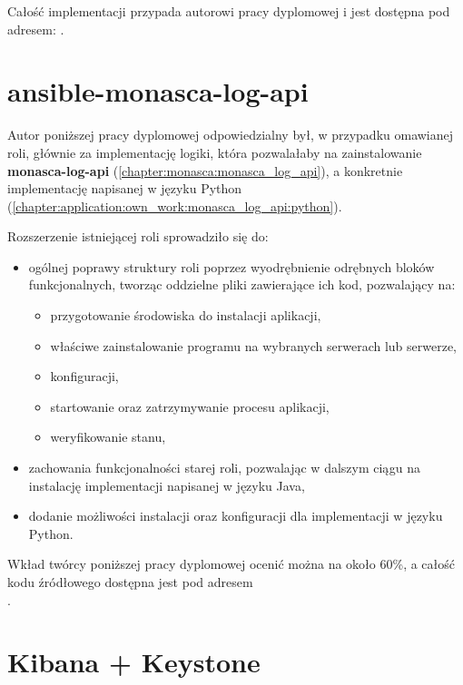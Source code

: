 Całość implementacji przypada autorowi pracy dyplomowej i jest dostępna pod adresem:
.

\section{ansible-monasca-log-api}
\label{chapter:application:own_work:ansible_monasca_log_api}

    Autor poniższej pracy dyplomowej odpowiedzialny był, w przypadku omawianej roli, głównie za implementację
    logiki, która pozwalałaby na zainstalowanie \textbf{monasca-log-api} (\ref{chapter:monasca:monasca_log_api}),
    a konkretnie implementację napisanej w języku Python (\ref{chapter:application:own_work:monasca_log_api:python}).
    
    Rozszerzenie istniejącej roli sprowadziło się do:
    \begin{itemize}
        \item ogólnej poprawy struktury roli poprzez wyodrębnienie odrębnych bloków funkcjonalnych, tworząc
        oddzielne pliki zawierające ich kod, pozwalający na:
        \begin{itemize}
            \item przygotowanie środowiska do instalacji aplikacji,
            \item właściwe zainstalowanie programu na wybranych serwerach lub serwerze,
            \item konfiguracji,
            \item startowanie oraz zatrzymywanie procesu aplikacji,
            \item weryfikowanie stanu,
        \end{itemize}
        \item zachowania funkcjonalności starej roli, pozwalając w dalszym ciągu na instalację implementacji
        napisanej w języku Java,
        \item dodanie możliwości instalacji oraz konfiguracji dla implementacji w języku Python.
    \end{itemize}
    
    Wkład twórcy poniższej pracy dyplomowej ocenić można na około 60\%, a całość kodu źródłowego
    dostępna jest pod adresem \\ .

\section{Kibana + Keystone}
\label{chapter:application:own_work:kibana_and_keystone}

